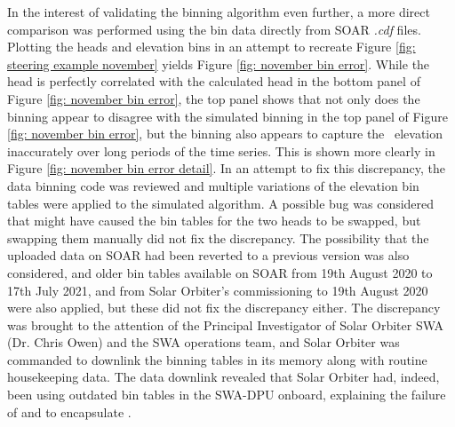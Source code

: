 In the interest of validating the binning algorithm even further, a more direct comparison was performed using the  bin data directly from SOAR \textit{.cdf} files. Plotting the  heads and elevation bins in an attempt to recreate Figure \ref{fig: steering example november} yields Figure \ref{fig: november bin error}. While the  head is perfectly correlated with the calculated head in the bottom panel of Figure \ref{fig: november bin error}, the top panel shows that not only does the  binning appear to disagree with the simulated binning in the top panel of Figure \ref{fig: november bin error}, but the  binning also appears to capture the \Beas\ elevation inaccurately over long periods of the time series. This is shown more clearly in Figure \ref{fig: november bin error detail}. In an attempt to fix this discrepancy, the data binning code was reviewed and multiple variations of the elevation bin tables were applied to the simulated algorithm. A possible bug was considered that might have caused the bin tables for the two heads to be swapped, but swapping them manually did not fix the discrepancy. The possibility that the uploaded data on SOAR had been reverted to a previous version was also considered, and older bin tables available on SOAR from 19th August 2020 to 17th July 2021, and from Solar Orbiter's commissioning to 19th August 2020 were also applied, but these did not fix the discrepancy either. The discrepancy was brought to the attention of the Principal Investigator of Solar Orbiter SWA (Dr. Chris Owen) and the SWA operations team, and Solar Orbiter was commanded to downlink the binning tables in its memory along with routine housekeeping data. The data downlink revealed that Solar Orbiter had, indeed, been using outdated bin tables in the SWA-DPU onboard, explaining the failure of  and  to encapsulate \Beas. 
\\

